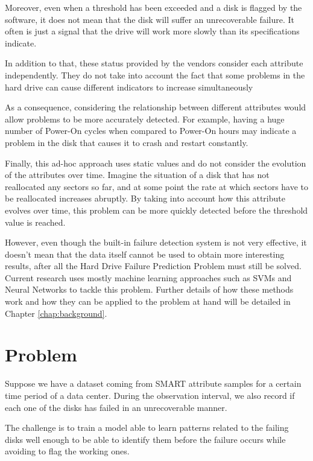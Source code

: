 Moreover, even when a threshold has been exceeded and a disk is flagged by the software, it does not mean that the disk will suffer an unrecoverable failure.
It often is just a signal that the drive will work more slowly than its specifications indicate.

In addition to that, these status provided by the vendors consider each attribute independently.
They do not take into account the fact that some problems in the hard drive can cause different indicators to increase simultaneously

As a consequence, considering the relationship between different attributes would allow problems to be more accurately detected.
For example, having a huge number of Power-On cycles when compared to Power-On hours may indicate a problem in the disk that causes it to crash and restart constantly.

Finally, this ad-hoc approach uses static values and do not consider the evolution of the attributes over time.
Imagine the situation of a disk that has not reallocated any sectors so far, and at some point the rate at which sectors have to be reallocated increases abruptly.
By taking into account how this attribute evolves over time, this problem can be more quickly detected before the threshold value is reached.

However, even though the built-in failure detection system is not very effective, it doesn't mean that the data itself cannot be used to obtain more interesting results, after all the Hard Drive Failure Prediction Problem must still be solved.
Current research uses mostly machine learning approaches such as SVMs and Neural Networks to tackle this problem.
Further details of how these methods work and how they can be applied to the problem at hand will be detailed in Chapter \ref{chap:background}. 

\section{Problem}\label{sec:problem}

Suppose we have a dataset coming from SMART attribute samples for a certain time period of a data center.
During the observation interval, we also record if each one of the disks has failed in an unrecoverable manner.

The challenge is to train a model able to learn patterns related to the failing disks well enough to be able to identify them before the failure occurs while avoiding to flag the working ones.

